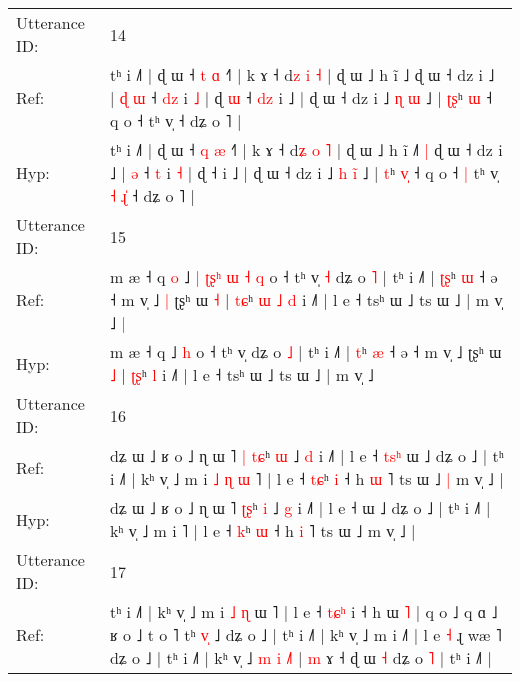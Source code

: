 \documentclass[10pt]{article}
\DeclareRobustCommand{\hl}[1]{{\textcolor{red}{#1}}}
\begin{document}
\begin{longtable}{ll}
 \\
\midrule
Utterance ID: & 14 \\
Ref: & tʰ i ˩˥ | ɖ ɯ ˧ \hl{t} \hl{ɑ} ˧˥ | k ɤ ˧ d\hl{z} \hl{i} \hl{˧} | ɖ ɯ ˩ h ĩ ˩\hl{}\hl{}\hl{} ɖ ɯ ˧ dz i ˩ |\hl{ }\hl{ɖ} \hl{ɯ} ˧ \hl{d}\hl{z} i \hl{˩} | ɖ\hl{ }\hl{ɯ} ˧\hl{ }\hl{d}\hl{z} i ˩ | ɖ ɯ ˧ dz i ˩ \hl{ɳ} \hl{}\hl{ɯ} ˩ | \hl{ʈ}\hl{ʂ}ʰ \hl{}\hl{ɯ} ˧ q o ˧\hl{}\hl{} tʰ v̩\hl{}\hl{}\hl{}\hl{}\hl{} ˧ dʑ o ˥ |
 \\
Hyp: & tʰ i ˩˥ | ɖ ɯ ˧ \hl{q} \hl{æ} ˧˥ | k ɤ ˧ d\hl{ʑ} \hl{o} \hl{˥} | ɖ ɯ ˩ h ĩ ˩\hl{˥}\hl{ }\hl{|} ɖ ɯ ˧ dz i ˩ |\hl{}\hl{} \hl{ə} ˧ \hl{}\hl{t} i \hl{˧} | ɖ\hl{}\hl{} ˧\hl{}\hl{}\hl{} i ˩ | ɖ ɯ ˧ dz i ˩ \hl{h} \hl{i}\hl{̃} ˩ | \hl{}\hl{t}ʰ \hl{v}\hl{̩} ˧ q o ˧\hl{ }\hl{|} tʰ v̩\hl{ }\hl{˧}\hl{ }\hl{ɻ}\hl{̍} ˧ dʑ o ˥ |
 \\
\midrule
Utterance ID: & 15 \\
Ref: & m æ ˧ q\hl{ }\hl{o} ˩\hl{ }\hl{|}\hl{ }\hl{ʈ}\hl{ʂ}\hl{ʰ}\hl{ }\hl{ɯ}\hl{ }\hl{˧} \hl{q} o ˧ tʰ v̩\hl{ }\hl{˧} dʑ o \hl{˥} | tʰ i ˩˥ | \hl{ʈ}\hl{ʂ}ʰ \hl{ɯ} ˧ ə ˧ m v̩ ˩\hl{ }\hl{|} ʈʂʰ ɯ \hl{˧} | \hl{t}\hl{ɕ}ʰ\hl{ }\hl{ɯ}\hl{ }\hl{˩} \hl{d} i ˩˥ | l e ˧ tsʰ ɯ ˩ ts ɯ ˩ | m v̩ ˩\hl{ }\hl{|}
 \\
Hyp: & m æ ˧ q\hl{}\hl{} ˩\hl{}\hl{}\hl{}\hl{}\hl{}\hl{}\hl{}\hl{}\hl{}\hl{} \hl{h} o ˧ tʰ v̩\hl{}\hl{} dʑ o \hl{˩} | tʰ i ˩˥ | \hl{}\hl{t}ʰ \hl{æ} ˧ ə ˧ m v̩ ˩\hl{}\hl{} ʈʂʰ ɯ \hl{˩} | \hl{ʈ}\hl{ʂ}ʰ\hl{}\hl{}\hl{}\hl{} \hl{l} i ˩˥ | l e ˧ tsʰ ɯ ˩ ts ɯ ˩ | m v̩ ˩\hl{}\hl{}
 \\
\midrule
Utterance ID: & 16 \\
Ref: & dʑ ɯ ˩ ʁ o ˩ ɳ ɯ ˥\hl{ }\hl{|} \hl{t}\hl{ɕ}ʰ \hl{ɯ} ˩ \hl{d} i ˩˥ | l e ˧\hl{ }\hl{t}\hl{s}\hl{ʰ} ɯ ˩ dʑ o ˩ | tʰ i ˩˥ | kʰ v̩ ˩ m i\hl{ }\hl{˩}\hl{ }\hl{ɳ}\hl{ }\hl{ɯ} ˥ | l e ˧ \hl{t}\hl{ɕ}ʰ \hl{i} ˧ h \hl{ɯ} ˥ ts ɯ ˩\hl{ }\hl{|} m v̩ ˩ |
 \\
Hyp: & dʑ ɯ ˩ ʁ o ˩ ɳ ɯ ˥\hl{}\hl{} \hl{ʈ}\hl{ʂ}ʰ \hl{i} ˩ \hl{g} i ˩˥ | l e ˧\hl{}\hl{}\hl{}\hl{} ɯ ˩ dʑ o ˩ | tʰ i ˩˥ | kʰ v̩ ˩ m i\hl{}\hl{}\hl{}\hl{}\hl{}\hl{} ˥ | l e ˧ \hl{}\hl{k}ʰ \hl{ɯ} ˧ h \hl{i} ˥ ts ɯ ˩\hl{}\hl{} m v̩ ˩ |
 \\
\midrule
Utterance ID: & 17 \\
Ref: & tʰ i ˩˥ | kʰ v̩ ˩ m i\hl{ }\hl{˩}\hl{ }\hl{ɳ} ɯ ˥ | l e ˧ \hl{t}\hl{ɕ}\hl{ʰ} i ˧ h ɯ \hl{˥} | q o ˩ q ɑ ˩ ʁ o ˩ t o ˥ tʰ \hl{v}\hl{̩} ˩ dʑ o ˩ | tʰ i ˩˥ | kʰ v̩ ˩ m i ˩˥ | l e\hl{ }\hl{˧} ɻ wæ ˥ dʑ o ˩ | tʰ i ˩˥ | kʰ v̩ ˩ \hl{m} \hl{i} \hl{˩}˥ | \hl{m} ɤ ˧ ɖ ɯ \hl{˧} dʑ o \hl{˥} | tʰ i ˩˥ |
 \\

\end{longtable}
\end{document}
